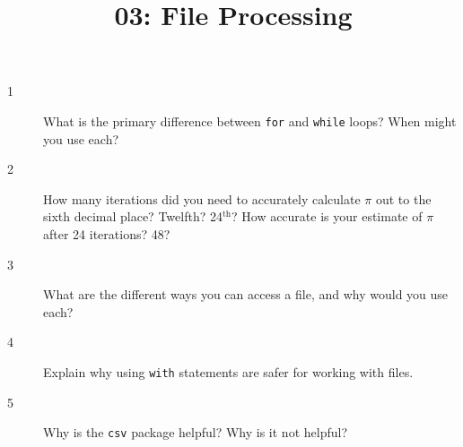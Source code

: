 \documentclass[10pt]{amsart}
\title{03: File Processing}
\begin{document}
\maketitle

\begin{description}
\item[1] What is the primary difference between \verb+for+ and \verb+while+
loops? When might you use each?
\vspace{0.75in}

\item[2] How many iterations did you need to accurately calculate $\pi$ out to
the sixth decimal place? Twelfth? 24$^{\textrm{th}}$? How accurate is your
estimate of $\pi$ after 24 iterations? 48?
\vspace{0.75in}

\item[3] What are the different ways you can access a file, and why would you
use each?
\vspace{0.75in}

\item[4] Explain why using \verb+with+ statements are safer for working with
files.
\vspace{0.75in}

\item[5] Why is the \verb+csv+ package helpful? Why is it not helpful?
\vspace{0.75in}
\end{description}
\end{document}
